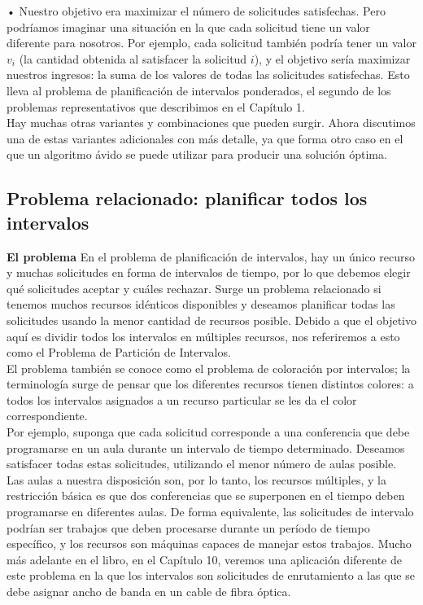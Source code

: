 \documentclass[a4paper, 12pt]{book}
\begin{document}
    • Nuestro objetivo era maximizar el número de solicitudes satisfechas. Pero podríamos imaginar una situación en la que cada solicitud tiene un valor diferente para nosotros. Por ejemplo, cada solicitud también podría tener un valor $v_i$ (la cantidad obtenida al satisfacer la solicitud $i$), y el objetivo sería maximizar nuestros ingresos: la suma de los valores de todas las solicitudes satisfechas. Esto lleva al problema de planificación de intervalos ponderados, el segundo de los problemas representativos que describimos en el Capítulo 1.\\

Hay muchas otras variantes y combinaciones que pueden surgir. Ahora discutimos una de estas variantes adicionales con más detalle, ya que forma otro caso en el que un algoritmo ávido se puede utilizar para producir una solución óptima.\\

\subsection{Problema relacionado: planificar todos los intervalos}

\textbf{El problema} En el problema de planificación de intervalos, hay un único recurso y muchas solicitudes en forma de intervalos de tiempo, por lo que debemos elegir qué solicitudes aceptar y cuáles rechazar. Surge un problema relacionado si tenemos muchos recursos idénticos disponibles y deseamos planificar todas las solicitudes usando la menor cantidad de recursos posible. Debido a que el objetivo aquí es dividir todos los intervalos en múltiples recursos, nos referiremos a esto como el Problema de Partición de Intervalos.\\

El problema también se conoce como el problema de coloración por intervalos; la terminología surge de pensar que los diferentes recursos tienen distintos colores: a todos los intervalos asignados a un recurso particular se les da el color correspondiente.\\

Por ejemplo, suponga que cada solicitud corresponde a una conferencia que debe programarse en un aula durante un intervalo de tiempo determinado. Deseamos satisfacer todas estas solicitudes, utilizando el menor número de aulas posible. Las aulas a nuestra disposición son, por lo tanto, los recursos múltiples, y la restricción básica es que dos conferencias que se superponen en el tiempo deben programarse en diferentes aulas. De forma equivalente, las solicitudes de intervalo podrían ser trabajos que deben procesarse durante un período de tiempo específico, y los recursos son máquinas capaces de manejar estos trabajos. Mucho más adelante en el libro, en el Capítulo 10, veremos una aplicación diferente de este problema en la que los intervalos son solicitudes de enrutamiento a las que se debe asignar ancho de banda en un cable de fibra óptica. \\
\end{document}
